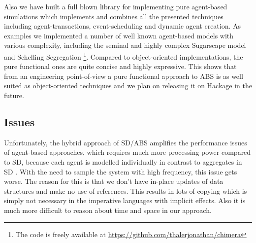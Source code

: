 Also we have built a full blown library for implementing pure agent-based simulations which implements and combines all the presented techniques including agent-transactions, event-scheduling and dynamic agent creation. As examples we implemented a number of well known agent-based models with various complexity, including the seminal and highly complex Sugarscape model \cite{epstein_growing_1996} and Schelling Segregation \cite{schelling_dynamic_1971} \footnote{The code is freely available at \url{https://github.com/thalerjonathan/chimera}}. Compared to object-oriented implementations, the pure functional ones are quite concise and highly expressive. This shows that from an engineering point-of-view a pure functional approach to ABS is as well suited as object-oriented techniques and we plan on releasing it on Hackage in the future.

\subsection*{Issues}
Unfortunately, the hybrid approach of SD/ABS amplifies the performance issues of agent-based approaches, which requires much more processing power compared to SD, because each agent is modelled individually in contrast to aggregates in SD \cite{macal_agent-based_2010}. With the need to sample the system with high frequency, this issue gets worse. The reason for this is that we don't have in-place updates of data structures and make no use of references. This results in lots of copying which is simply not necessary in the imperative languages with implicit effects. Also it is much more difficult to reason about time and space in our approach. %

